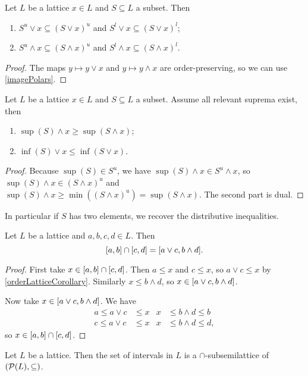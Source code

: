 \begin{lemma} \label{UpperLowerBoundsMeetJoin}
Let $L$ be a lattice $x\in L$ and $S\subseteq L$ a subset. Then
\begin{enumerate}
\item $S^u\vee x \subseteq (S\vee x)^u$ and $S^l\vee x \subseteq (S\vee x)^l$;
\item $S^u\wedge x \subseteq (S\wedge x)^u$ and $S^l\wedge x \subseteq (S\wedge x)^l$.
\end{enumerate}
\end{lemma}
\begin{proof}
The maps $y\mapsto y\vee x$ and $y\mapsto y \wedge x$ are order-preserving, so we can use \ref{imagePolars}.
\end{proof}
\begin{corollary} \label{infiniteDistributiveInequalities}
Let $L$ be a lattice $x\in L$ and $S\subseteq L$ a subset. Assume all relevant suprema exist, then
\begin{enumerate}
\item $\sup(S)\wedge x \geq \sup(S \wedge x)$;
\item $\inf(S)\vee x \leq \inf(S \vee x)$.
\end{enumerate}
\end{corollary}
\begin{proof}
Because $\sup(S)\in S^u$, we have $\sup(S)\wedge x \in S^u\wedge x$, so $\sup(S)\wedge x \in (S\wedge x)^u$ and $\sup(S)\wedge x \geq \min((S\wedge x)^u) = \sup(S\wedge x)$. The second part is dual.
\end{proof}
In particular if $S$ has two elements, we recover the distributive inequalities.

\begin{proposition} \label{latticeIntervalIntersection}
Let $L$ be a lattice and $a,b,c,d\in L$. Then
\[ \interval{a,b} \cap \interval{c,d} = \interval{a\vee c, b\wedge d}. \]
\end{proposition}
\begin{proof}
First take $x\in \interval{a,b} \cap \interval{c,d}$. Then $a\leq x$ and $c\leq x$, so $a\vee c \leq x$ by \ref{orderLatticeCorollary}. Similarly $x\leq b\wedge d$, so $x\in\interval{a\vee c, b\wedge d}$.

Now take $x\in\interval{a\vee c, b\wedge d}$. We have
\begin{align*}
a\leq a\vee c &\leq x &  x&\leq b\wedge d \leq b \\
c\leq a\vee c &\leq x &  x&\leq b\wedge d \leq d,
\end{align*}
so $x\in \interval{a,b} \cap \interval{c,d}$.
\end{proof}
\begin{corollary}
Let $L$ be a lattice. Then the set of intervals in $L$ is a $\cap$-subsemilattice of $\left( \operatorname{\mathcal{P}}(L), \subseteq \right)$.
\end{corollary}

